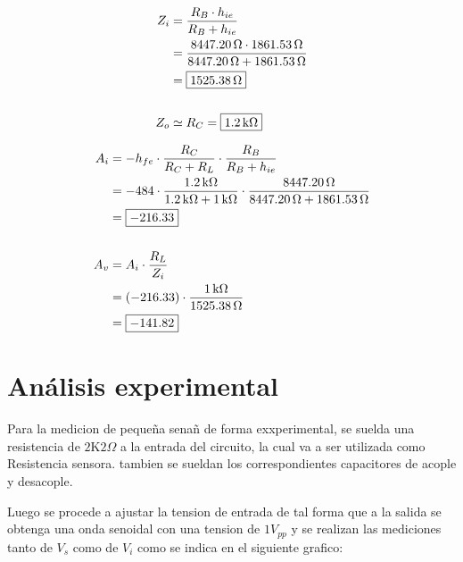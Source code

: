       
      \noindent
      \begin{minipage}[t]{0.45\linewidth}
      \begin{align*}
      Z_i &= \frac{R_B \cdot h_{ie}}{R_B + h_{ie}} \\
          &= \frac{8447.20\,\Omega \cdot 1861.53\,\Omega}{8447.20\,\Omega + 1861.53\,\Omega} \\
          &= \boxed{1525.38\,\Omega} \\[16pt]
      Z_o &\simeq R_C = \boxed{1.2\,\text{k}\Omega}
      \end{align*}
      \end{minipage}\hfill
      \begin{minipage}[t]{0.45\linewidth}
      \begin{align*}
      A_i &= -h_{fe}\cdot \frac{R_C}{R_C+R_L}\cdot \frac{R_B}{R_B+h_{ie}} \\
          &= -484 \cdot \frac{1.2\,\text{k}\Omega}{1.2\,\text{k}\Omega+1\,\text{k}\Omega}\cdot \frac{8447.20\,\Omega}{8447.20\,\Omega+1861.53\,\Omega} \\
          &= \boxed{-216.33} \\[16pt]
      A_v &= A_i \cdot \frac{R_L}{Z_i} \\
          &= (-216.33)\cdot \frac{1\,\text{k}\Omega}{1525.38\,\Omega} \\
          &= \boxed{-141.82}
      \end{align*}
      \end{minipage}    

  \section{Análisis experimental}
    Para la medicion de pequeña senañ de forma exxperimental, se suelda una resistencia de $2\text{K}2\Omega$ a la entrada
    del circuito, la cual va a ser utilizada como Resistencia sensora. tambien se sueldan los correspondientes capacitores
    de acople y desacople.

    Luego se procede a ajustar la tension de entrada de tal forma que a la salida se obtenga una onda senoidal con una
    tension de $1V_{pp}$ y se realizan las mediciones tanto de $V_s$ como de $V_i$ como se indica en el siguiente
    grafico:


